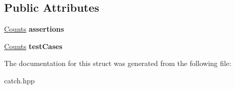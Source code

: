 \subsection*{Public Attributes}
\begin{DoxyCompactItemize}
\item 
\mbox{\label{structCatch_1_1Totals_a885ded66df752147b30c3d45aa602ec9}} 
\hyperlink{structCatch_1_1Counts}{Counts} {\bfseries assertions}
\item 
\mbox{\label{structCatch_1_1Totals_adb195fe477aedee2ecea88c888f16506}} 
\hyperlink{structCatch_1_1Counts}{Counts} {\bfseries test\+Cases}
\end{DoxyCompactItemize}


The documentation for this struct was generated from the following file\+:\begin{DoxyCompactItemize}
\item 
catch.\+hpp\end{DoxyCompactItemize}
